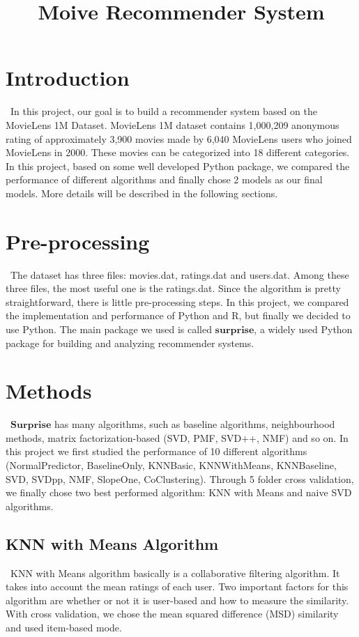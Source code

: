 \documentclass[12pt]{article}
\title{Moive Recommender System}
\begin{document}
%
\maketitle

\section{Introduction}
\quad\ In this project, our goal is to build a recommender system based on the MovieLens 1M Dataset. MovieLens 1M dataset contains 1,000,209 anonymous rating of approximately 3,900 movies made by 6,040 MovieLens users who joined MovieLens in 2000. These movies can be categorized into 18 different categories. In this project, based on some well developed Python package, we compared the performance of different algorithms and finally chose 2 models as our final models. More details will be described in the following sections.

\section{Pre-processing}
\quad\ The dataset has three files: movies.dat, ratings.dat and users.dat. Among these three files, the most useful one is the ratings.dat. Since the algorithm is pretty straightforward, there is little pre-processing steps. In this project, we compared the implementation and performance of Python and R, but finally we decided to use Python. The main package we used is called $ \textbf{surprise} $, a widely used Python package for building and analyzing recommender systems.

\section{Methods}

\quad\ $ \textbf{Surprise} $ has many algorithms, such as baseline algorithms, neighbourhood methods, matrix factorization-based (SVD, PMF, SVD++, NMF) and so on. In this project we first studied the performance of 10 different algorithms (NormalPredictor, BaselineOnly, KNNBasic, KNNWithMeans, KNNBaseline, SVD, SVDpp, NMF, SlopeOne, CoClustering). Through 5 folder cross validation, we finally chose two best performed algorithm: KNN with Means and naive SVD algorithms.

\subsection{KNN with Means Algorithm}
\quad\ KNN with Means algorithm basically is a collaborative filtering algorithm. It takes into account the mean ratings of each user. Two important factors for this algorithm are whether or not it is user-based and how to measure the similarity. With cross validation, we chose the mean squared difference (MSD) similarity and used item-based mode.
\end{document}
